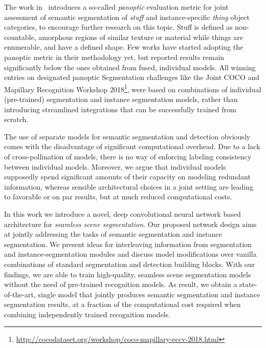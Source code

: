 \documentclass[10pt,twocolumn,letterpaper]{article}
\begin{document}
The work in~\cite{Kirillov18} introduces a so-called \textit{panoptic} evaluation metric for joint assessment of semantic segmentation of \textit{stuff} and instance-specific \textit{thing} object categories, to encourage further research on this topic. Stuff is defined as non-countable, amorphous regions of similar texture or material while things are enumerable, and have a defined shape. Few works have started adopting the panoptic metric in their methodology yet, but reported results remain significantly below the ones obtained from fused, individual models. All winning entries on designated panoptic Segmentation challenges like \eg the Joint COCO and Mapillary Recognition Workshop 2018\footnote{\scriptsize \url{http://cocodataset.org/workshop/coco-mapillary-eccv-2018.html}}, were based on combinations of individual (pre-trained) segmentation and instance segmentation models, rather than introducing streamlined integrations that can be successfully trained from scratch.

The use of separate models for semantic segmentation and detection obviously comes with the disadvantage of significant computational overhead. Due to a lack of cross-pollination of models, there is no way of enforcing labeling consistency between individual models. Moreover, we argue that individual models supposedly spend significant amounts of their capacity on modeling redundant information, whereas sensible architectural choices in a joint setting are leading to favorable or on par results, but at much reduced computational costs.

In this work we introduce a novel, deep convolutional neural network based architecture for \textit{seamless scene segmentation}. Our proposed network design aims at jointly addressing the tasks of semantic segmentation and instance segmentation. We present ideas for interleaving information from segmentation and instance-segmentation modules and discuss model modifications over vanilla combinations of standard segmentation and detection building blocks. With our findings, we are able to train high-quality, seamless scene segmentation models without the need of pre-trained recognition models. As result, we obtain a state-of-the-art, single model that jointly produces semantic segmentation and instance segmentation results, at a fraction of the computational cost required when combining independently trained recognition models.
\end{document}
